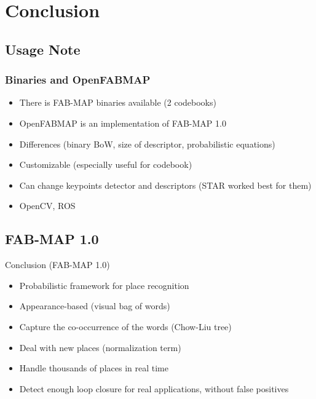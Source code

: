 \section{Conclusion}

\subsection{Usage Note}
\begin{frame}
    \frametitle{Binaries and OpenFABMAP}
    \begin{itemize}
        \item There is FAB-MAP binaries available (2 codebooks)
        \item OpenFABMAP is an implementation of FAB-MAP 1.0
        \item Differences (binary BoW, size of descriptor, probabilistic equations)
        \item Customizable (especially useful for codebook)
        \item Can change keypoints detector and descriptors (STAR worked best for them)
        \item OpenCV, ROS
    \end{itemize}
\end{frame}

\subsection{FAB-MAP 1.0}
\begin{frame}{Conclusion (FAB-MAP 1.0)}
    \begin{itemize}
        \item Probabilistic framework for place recognition
        \item Appearance-based (visual bag of words)
        \item Capture the co-occurrence of the words (Chow-Liu tree)
        \item Deal with new places (normalization term)
        \item Handle thousands of places in real time
        \item Detect enough loop closure for real applications, without false positives
    \end{itemize}
\end{frame}

